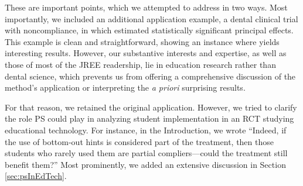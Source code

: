 \documentclass[]{article}
\begin{document}
These are important points, which we attempted to address in two ways. 
Most importantly, we included an additional application example, a dental clinical trial with noncompliance, in which \geepers estimated statistically significant principal effects. This example is clean and straightforward, showing an instance where \geepers yields interesting results. 
However, our substantive interests and expertise, as well as those of most of the JREE readership, lie in education research rather than dental science, which prevents us from offering a comprehensive discussion of the method's application or interpreting the \emph{a priori} surprising results. 

For that reason, we retained the original application. 
However, we tried to clarify the role PS could play in analyzing student implementation in an RCT studying educational technology. 
For instance, in the Introduction, we wrote ``Indeed, if the use of bottom-out hints is considered part of the treatment, then those students who rarely used them are partial compliers---could the treatment still benefit them?''
Most prominently, we added an extensive discussion in Section \ref{sec:psInEdTech}.


    
\end{document}
